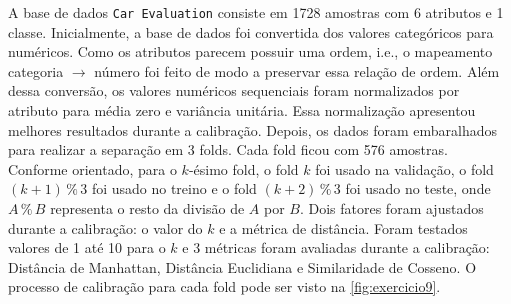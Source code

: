 \documentclass{article}
\begin{document}
A base de dados \texttt{Car Evaluation} consiste em 1728 amostras com 6 atributos e 1 classe. Inicialmente, a base de dados foi convertida dos valores categóricos para numéricos. Como os atributos parecem possuir uma ordem, i.e., o mapeamento categoria $\rightarrow$ número foi feito de modo a preservar essa relação de ordem. Além dessa conversão, os valores numéricos sequenciais foram normalizados por atributo para média zero e variância unitária. Essa normalização apresentou melhores resultados durante a calibração. Depois, os dados foram embaralhados para realizar a separação em 3 folds. Cada fold ficou com 576 amostras. Conforme orientado, para o $k$-ésimo fold, o fold $k$ foi usado na validação, o fold $(k+1) \mathbin{\%} 3$ foi usado no treino e o fold $(k+2) \mathbin{\%} 3$ foi usado no teste, onde $A\mathbin{\%}B$ representa o resto da divisão de $A$ por $B$. Dois fatores foram ajustados durante a calibração: o valor do $k$ e a métrica de distância. Foram testados valores de 1 até 10 para o $k$ e 3 métricas foram avaliadas durante a calibração: Distância de Manhattan, Distância Euclidiana e Similaridade de Cosseno. O processo de calibração para cada fold pode ser visto na \autoref{fig:exercicio9}.
\end{document}
